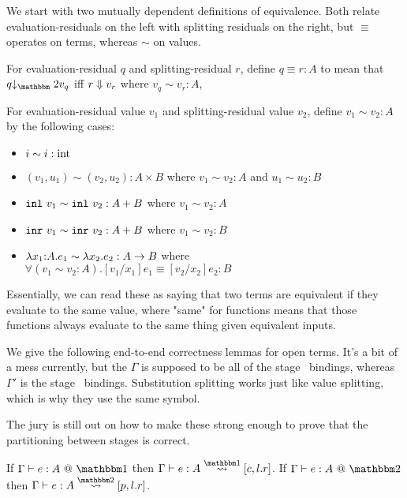 We start with two mutually dependent definitions of equivalence.  
Both relate evaluation-residuals on the left with splitting residuals on the right,
but $\equiv$ operates on terms, whereas $\sim$ on values.

\begin{definition}
For evaluation-residual $q$ and splitting-residual $r$, define $q \equiv r : A$ to mean that 
$q \tworedsym v_q$ iff ${r} \Downarrow {v_r}$ where $v_q \sim v_r : A$, 
\end{definition}

\begin{definition}
For evaluation-residual value $v_1$ and splitting-residual value $v_2$, define $v_1 \sim v_2 : A$ by the following cases:
\begin{itemize}
\item $i \sim i : {\rm int}$
\item $(v_1,u_1) \sim (v_2,u_2) : A \times B$ where $v_1 \sim v_2 : A$ and $u_1 \sim u_2 : B$
\item ${\tt inl}~v_1 \sim {\tt inl}~v_2 : A + B$ where $v_1 \sim v_2 : A$
\item ${\tt inr}~v_1 \sim {\tt inr}~v_2 : A + B$ where $v_1 \sim v_2 : B$
\item $\lambda{x_1}\mathrm{:}{A}.{e_1} \sim \lambda x_2.e_2 : A \to B$ where \\ $\forall (v_1 \sim v_2 : A). [v_1/x_1]e_1 \equiv [v_2/x_2]e_2 : B$
\end{itemize}
\end{definition}

Essentially, we can read these as saying that two terms are equivalent if they evaluate to the same value,
where "same" for functions means that those functions always evaluate to the same thing given equivalent inputs.

We give the following end-to-end correctness lemmas for open terms. 
It's a bit of a mess currently, but the $\Gamma$ is supposed to be all of the stage \bbone\ bindings, 
whereas $\Gamma'$ is the stage \bbtwo\ bindings.
Substitution splitting works just like value splitting, which is why they use the same symbol.

The jury is still out on how to make these strong enough to prove that the partitioning between stages is correct.

\begin{lemma}
If $\typesone e A$ then
$\Gamma\vdash e : A \splitonesym [c,l.r]$.
If $\typestwo e A$ then
$\Gamma\vdash e : A \splittwosym [p,l.r]$.
\end{lemma}

